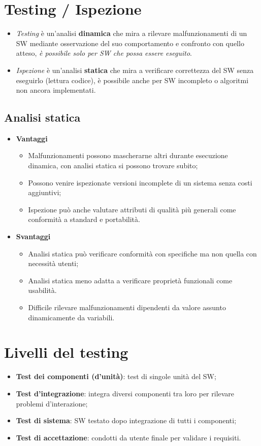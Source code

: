 \documentclass{article}
\begin{document}
  \section{Testing / Ispezione}
    \begin{itemize}
        \item \textit{Testing} è un'analisi \textbf{dinamica} che mira a rilevare malfunzionamenti di un SW mediante osservazione del suo comportamento e confronto con quello atteso, \textit{è possibile solo per SW che possa essere eseguito}.
        \item \textit{Ispezione} è un'analisi \textbf{statica} che mira a verificare correttezza del SW senza eseguirlo (lettura codice), è possibile anche per SW incompleto o algoritmi non ancora implementati.
    \end{itemize}
    \subsection{Analisi statica}
      \begin{itemize}
          \item \textbf{Vantaggi}
            \begin{itemize}
                \item Malfunzionamenti possono mascherarne altri durante esecuzione dinamica, con analisi statica si possono trovare subito;
                \item Possono venire ispezionate versioni incomplete di un sistema senza costi aggiuntivi;
                \item Ispezione può anche valutare attributi di qualità più generali come conformità a standard e portabilità.
            \end{itemize}
          \item \textbf{Svantaggi}
            \begin{itemize}
                \item Analisi statica può verificare conformità con specifiche ma non quella con necessità utenti;
                \item Analisi statica meno adatta a verificare proprietà funzionali come usabilità.
                \item Difficile rilevare malfunzionamenti dipendenti da valore assunto dinamicamente da variabili.
            \end{itemize}
      \end{itemize}
  \section{Livelli del testing}
    \begin{itemize}
        \item \textbf{Test dei componenti (d'unità)}: test di singole unità del SW;
        \item \textbf{Test d'integrazione}: integra diversi componenti tra loro per rilevare problemi d'interazione;
        \item \textbf{Test di sistema}: SW testato dopo integrazione di tutti i componenti;
        \item \textbf{Test di accettazione}: condotti da utente finale per validare i requisiti.
    \end{itemize}
\end{document}
